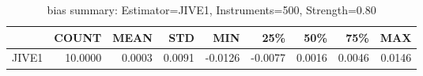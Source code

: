 \begin{table}[ht]
\centering
\caption{bias summary: Estimator=JIVE1, Instruments=500, Strength=0.80}
\begin{tabular}{lrrrrrrrr}
\toprule
 & COUNT & MEAN & STD & MIN & 25\% & 50\% & 75\% & MAX \\
\midrule
JIVE1 & 10.0000 & 0.0003 & 0.0091 & -0.0126 & -0.0077 & 0.0016 & 0.0046 & 0.0146 \\
\bottomrule
\end{tabular}
\end{table}
